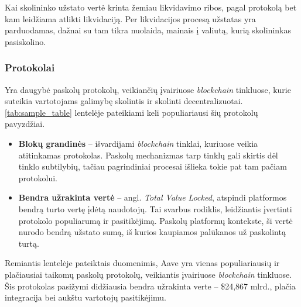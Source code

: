 \documentclass[]{VUMIFTemplateClass}
\begin{document}
Kai skolininko užstato vertė krinta žemiau likvidavimo ribos, pagal protokolą bet kam leidžiama atlikti likvidaciją. Per likvidacijos procesą užstatas yra parduodamas, dažnai su tam tikra nuolaida, mainais į valiutą, kurią skolininkas pasiskolino. \cite{venussavokosbendras}

\subsubsection{Protokolai}

Yra daugybė paskolų protokolų, veikiančių įvairiuose \textit{blockchain} tinkluose, kurie suteikia vartotojams galimybę skolintis ir skolinti decentralizuotai. \ref{tab:sample_table} lentelėje pateikiami keli populiariausi šių protokolų pavyzdžiai. 

\begin{itemize}
  \item \textbf{Blokų grandinės} – išvardijami \textit{blockchain} tinklai, kuriuose veikia atitinkamas protokolas. Paskolų mechanizmas tarp tinklų gali skirtis dėl tinklo subtilybių, tačiau pagrindiniai procesai išlieka tokie pat tam pačiam protokolui.
  \item \textbf{Bendra užrakinta vertė} – angl. \textit{Total Value Locked}, atspindi platformos bendrą turto vertę įdėtą naudotojų. Tai svarbus rodiklis, leidžiantis įvertinti protokolo populiarumą ir pasitikėjimą. Paskolų platformų kontekste, ši vertė nurodo bendrą užstato sumą, iš kurios kaupiamos palūkanos už paskolintą turtą.
  \end{itemize}
  
Remiantis lentelėje pateiktais duomenimis, Aave yra vienas populiariausių ir plačiausiai taikomų paskolų protokolų, veikiantis įvairiuose \textit{blockchain} tinkluose. Šis protokolas pasižymi didžiausia bendra užrakinta verte – \$24,867 mlrd., plačia integracija bei aukštu vartotojų pasitikėjimu.
\end{document}
